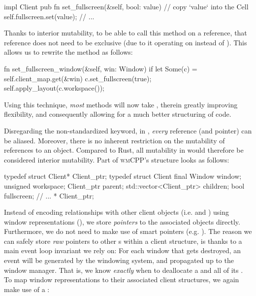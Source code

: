 \begin{rustblock}
  impl Client {
    pub fn set_fullscreen(&self, bool: value) {
      // copy `value` into the Cell
      self.fullscreen.set(value);
    }
    // ...
  }
\end{rustblock}

Thanks to interior mutability, to be able to call this method on a 
reference, that reference does not need to be exclusive (due to it operating
on  instead of ). This allows us to rewrite the
 method as follows:

\begin{rustblock}
  fn set_fullscreen_window(&self, win: Window) {
    if let Some(c) = self.client_map.get(&win) {
      c.set_fullscreen(true);
      self.apply_layout(c.workspace());
    }
  }
\end{rustblock}

Using this technique, \textit{most}  methods will now take
, therein greatly improving flexibility, and consequently allowing
for a much better structuring of code.


Disregarding the non-standardized  keyword, in \cpp,
\textit{every} reference (and pointer) can be aliased\cite{cppstd}. Moreover,
there is no inherent restriction on the mutability of references to an object.
Compared to Rust, all mutability in \cpp would therefore be considered interior
mutability. Part of \textsc{wmCPP}'s  structure looks as follows:

\begin{cppblock}
  typedef struct Client* Client_ptr;
  typedef struct Client final
  {
    Window window;
    unsigned workspace;
    Client_ptr parent;
    std::vector<Client_ptr> children;
    bool fullscreen;
    // ...
  }* Client_ptr;
\end{cppblock}

Instead of encoding relationships with other client objects (i.e. 
and ) using window representations (), we store
\textit{pointers} to the associated objects directly. Furthermore, we do not
need to make use of smart pointers (e.g. ). The reason
we can safely store \textit{raw} pointers to other s within a
client structure, is thanks to a main event loop invariant we rely on: For each
window that gets destroyed, an event will be generated by the windowing system,
and propagated up to the window manager. That is, we know \textit{exactly} when
to deallocate a  and all of its . To map window
representations to their associated client structures, we again make use of a
:

